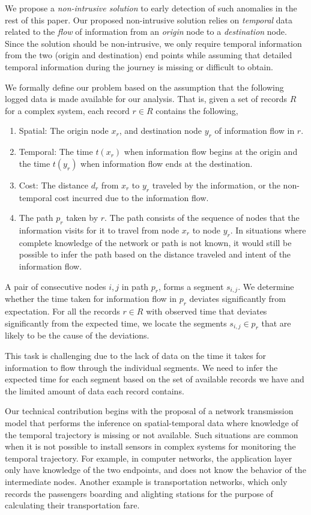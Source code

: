 \documentclass[draft]{sig-alternate}
\begin{document}
We propose a \emph{non-intrusive solution} to early detection of such anomalies in the rest of this paper. Our proposed non-intrusive solution relies on \emph{temporal} data related to the \emph{flow} of information from an \emph{origin} node to a \emph{destination} node. Since the solution should be non-intrusive, we only require temporal information from the two (origin and destination) end points while assuming that detailed temporal information during the journey is missing or difficult to obtain.

We formally define our problem based on the assumption that the following logged data is made available for our analysis. That is, given a set of records $R$ for a complex system, each record $r \in R$ contains the following,
\begin{enumerate}
	\item Spatial: The origin node $x_r$, and destination node $y_r$ of information flow in $r$.
	\item Temporal: The time $t(x_r)$ when information flow begins at the origin and the time $t(y_r)$ when information flow ends at the destination.
	\item Cost: The distance $d_r$ from $x_r$ to $y_r$ traveled by the information, or the non-temporal cost incurred due to the information flow.
	\item The path $p_r$ taken by $r$. The path consists of the sequence of nodes that the information visits for it to travel from node $x_r$ to node $y_r$. In situations where complete knowledge of the network or path is not known, it would still be possible to infer the path based on the distance traveled and intent of the information flow.
\end{enumerate}
A pair of consecutive nodes $i,j$ in path $p_r$, forms a segment $s_{i,j}$. We determine whether the time taken for information flow in $p_r$ deviates significantly from expectation. For all the records $r \in R$ with observed time that deviates significantly from the expected time, we locate the segments $s_{i,j} \in p_r$ that are likely to be the cause of the deviations.

This task is challenging due to the lack of data on the time it takes for information to flow through the individual segments. We need to infer the expected time for each segment based on the set of available records we have and the limited amount of data each record contains.

Our technical contribution begins with the proposal of a network transmission model that performs the inference on spatial-temporal data where knowledge of the temporal trajectory is missing or not available. Such situations are common when it is not possible to install sensors in complex systems for monitoring the temporal trajectory. For example, in computer networks, the application layer only have knowledge of the two endpoints, and does not know the behavior of the intermediate nodes. Another example is transportation networks, which only records the passengers boarding and alighting stations for the purpose of calculating their transportation fare.
\end{document}
